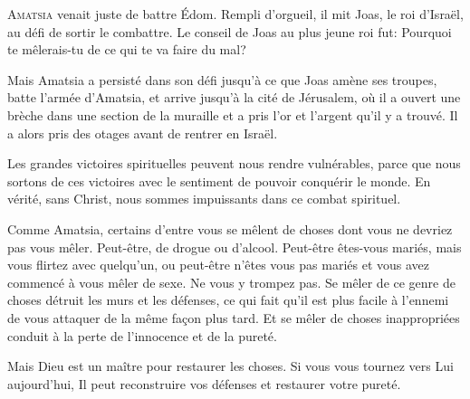 



\lettrine{A}{matsia} venait juste de battre Édom.
 Rempli d'orgueil, il mit Joas, le roi d'Israël,
 au défi de sortir le combattre.
 Le conseil de Joas au plus jeune roi fut:
 \Og Pourquoi te mêlerais-tu de ce qui te va faire du mal? \Fg{}

Mais Amatsia a persisté dans son défi jusqu'à ce que Joas
 amène ses troupes, batte l'armée d'Amatsia, et arrive
 jusqu'à la cité de Jérusalem, où il a ouvert une brèche
 dans une section de la muraille et a pris l'or et l'argent
 qu'il y a trouvé.
 Il a alors pris des otages avant de rentrer en Israël. 


Les grandes victoires spirituelles peuvent nous rendre vulnérables,
 parce que nous sortons de ces victoires avec le sentiment de pouvoir
 conquérir le monde. En vérité, sans Christ, nous sommes impuissants
 dans ce combat spirituel. 

Comme Amatsia, certains d'entre vous se mêlent de choses
 dont vous ne devriez pas vous mêler. Peut-être, de drogue ou d'alcool.
 Peut-être êtes-vous mariés, mais vous flirtez avec quelqu'un,
 ou peut-être n'êtes vous pas mariés et vous avez commencé
 à vous mêler de sexe. Ne vous y trompez pas.
 Se mêler de ce genre de choses détruit les murs et les défenses,
 ce qui fait qu'il est plus facile à l'ennemi de vous attaquer
 de la même fa\c{c}on plus tard. Et se mêler de choses inappropriées
 conduit à la perte de l'innocence et de la pureté. 

Mais Dieu est un maître pour restaurer les choses.
 Si vous vous tournez vers Lui aujourd'hui,
 Il peut reconstruire vos défenses et restaurer votre pureté. 

\dvrule




